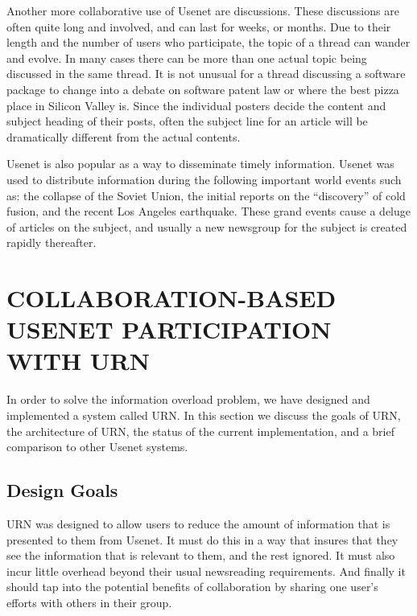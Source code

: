 Another more collaborative use of Usenet are discussions. These discussions are
often quite long and involved, and can last for weeks, or months. Due to their
length and the number of users who participate, the topic of a thread can
wander and evolve. In many cases there can be more than one actual topic being
discussed in the same thread. It is not unusual for a thread discussing a
software package to change into a debate on software patent law or where the
best pizza place in Silicon Valley is. Since the individual posters decide the
content and subject heading of their posts, often the subject line for an
article will be dramatically different from the actual contents.

Usenet is also popular as a way to disseminate timely information. Usenet was
used to distribute information during the following important world events such
as: the collapse of the Soviet Union, the initial reports on the ``discovery''
of cold fusion, and the recent Los Angeles earthquake. These grand events cause
a deluge of articles on the subject, and usually a new newsgroup for the
subject is created rapidly thereafter.

\section{COLLABORATION-BASED USENET PARTICIPATION WITH URN}


In order to solve the information overload problem, we have designed and
implemented a system called URN. In this section we discuss the goals of URN,
the architecture of URN, the status of the current implementation, and a brief
comparison to other Usenet systems.

\subsection{Design Goals}

URN was designed to allow users to reduce the amount of information that is
presented to them from Usenet. It must do this in a way that insures that they
see the information that is relevant to them, and the rest ignored. It must
also incur little overhead beyond their usual newsreading requirements. And
finally it should tap into the potential benefits of collaboration by sharing
one user's efforts with others in their group.

